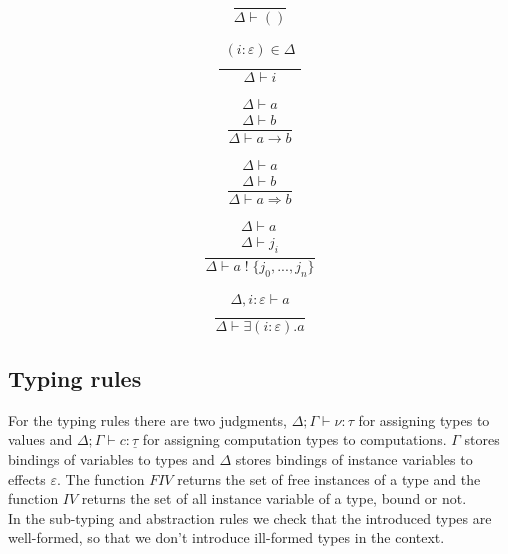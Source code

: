 \documentclass[12pt]{article}
\newcommand\eff[0]{\varepsilon}
\newcommand\ty[0]{\tau}
\newcommand\tunit[0]{()}
\newcommand\tarr[2]{#1 \rightarrow #2}
\newcommand\thandler[2]{#1 \Rightarrow #2}
\newcommand\cty[0]{\underline{\ty}}
\newcommand\aty[2]{#1 \; ! \; #2}
\newcommand\texists[3]{\exists(#1:#2) . #3}
\newcommand\val[0]{\nu}
\newcommand\comp[0]{c}
\begin{document}
\begin{minipage}{0.25\textwidth}
\[\frac{
	\begin{array}{l}
	\end{array}
}{
	\Delta \vdash \tunit
}\]
\end{minipage}
\begin{minipage}{0.25\textwidth}
\[\frac{
	\begin{array}{l}
	(i : \eff) \in \Delta \\
	\end{array}
}{
	\Delta \vdash i
}\]
\end{minipage}
\begin{minipage}{0.25\textwidth}
\[\frac{
	\begin{array}{l}
	\Delta \vdash a  \\
	\Delta \vdash b
	\end{array}
}{
	\Delta \vdash \tarr{a}{b}
}\]
\end{minipage}
\begin{minipage}{0.25\textwidth}
\[\frac{
	\begin{array}{l}
	\Delta \vdash a  \\
	\Delta \vdash b
	\end{array}
}{
	\Delta \vdash \thandler{a}{b}
}\]
\end{minipage}
\begin{minipage}{0.5\textwidth}
\[\frac{
	\begin{array}{l}
	\Delta \vdash a  \\
	\Delta \vdash j_i
	\end{array}
}{
	\Delta \vdash \aty{a}{\{ j_0, ..., j_n \}}
}\]
\end{minipage}
\begin{minipage}{0.5\textwidth}
\[\frac{
	\begin{array}{l}
	\Delta , i : \eff \vdash a  \\
	\end{array}
}{
	\Delta \vdash \texists{i}{\eff}{a}
}\]
\end{minipage}

\newpage
\subsection{Typing rules}
For the typing rules there are two judgments,
$\Delta;\Gamma \vdash \val : \ty$ for assigning types to values and $\Delta;\Gamma \vdash \comp : \cty$ for assigning computation types to computations. $\Gamma$ stores bindings of variables to types and $\Delta$ stores bindings of instance variables to effects $\eff$.  The function $FIV$ returns the set of free instances of a type and the function $IV$ returns the set of all instance variable of a type, bound or not. \\
In the sub-typing and abstraction rules we check that the introduced types are well-formed, so that we don't introduce ill-formed types in the context.
\end{document}
